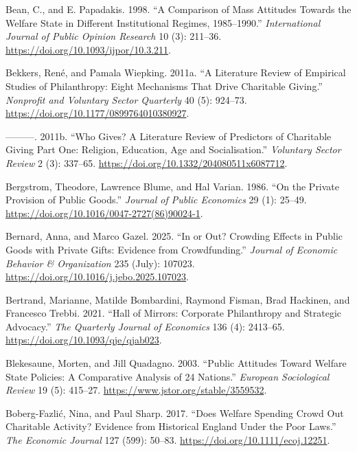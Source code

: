 \documentclass[
  11pt,
  oneside]{article}
\newlength{\cslhangindent}
\newenvironment{CSLReferences}[2] %
 {\begin{list}{}{%
  \setlength{\itemindent}{0pt}
  \setlength{\leftmargin}{0pt}
  \setlength{\parsep}{0pt}
  \ifodd #1
   \setlength{\leftmargin}{\cslhangindent}
   \setlength{\itemindent}{-1\cslhangindent}
  \fi
  \setlength{\itemsep}{#2\baselineskip}}}
 {\end{list}}
\begin{document}
\begin{CSLReferences}{1}{0}
Bean, C., and E. Papadakis. 1998. {``A Comparison of Mass Attitudes Towards the Welfare State in Different Institutional Regimes, 1985--1990.''} \emph{International Journal of Public Opinion Research} 10 (3): 211--36. \url{https://doi.org/10.1093/ijpor/10.3.211}.

Bekkers, René, and Pamala Wiepking. 2011a. {``A {Literature Review} of {Empirical Studies} of {Philanthropy}: {Eight Mechanisms That Drive Charitable Giving}.''} \emph{Nonprofit and Voluntary Sector Quarterly} 40 (5): 924--73. \url{https://doi.org/10.1177/0899764010380927}.

---------. 2011b. {``Who Gives? {A} Literature Review of Predictors of Charitable Giving {Part One}: {Religion}, Education, Age and Socialisation.''} \emph{Voluntary Sector Review} 2 (3): 337--65. \url{https://doi.org/10.1332/204080511x6087712}.

Bergstrom, Theodore, Lawrence Blume, and Hal Varian. 1986. {``On the Private Provision of Public Goods.''} \emph{Journal of Public Economics} 29 (1): 25--49. \url{https://doi.org/10.1016/0047-2727(86)90024-1}.

Bernard, Anna, and Marco Gazel. 2025. {``In or Out? {Crowding} Effects in Public Goods with Private Gifts: {Evidence} from Crowdfunding.''} \emph{Journal of Economic Behavior \& Organization} 235 (July): 107023. \url{https://doi.org/10.1016/j.jebo.2025.107023}.

Bertrand, Marianne, Matilde Bombardini, Raymond Fisman, Brad Hackinen, and Francesco Trebbi. 2021. {``Hall of {Mirrors}: {Corporate Philanthropy} and {Strategic Advocacy}.''} \emph{The Quarterly Journal of Economics} 136 (4): 2413--65. \url{https://doi.org/10.1093/qje/qjab023}.

Blekesaune, Morten, and Jill Quadagno. 2003. {``Public {Attitudes} Toward {Welfare State Policies}: {A Comparative Analysis} of 24 {Nations}.''} \emph{European Sociological Review} 19 (5): 415--27. \url{https://www.jstor.org/stable/3559532}.

Boberg-Fazlić, Nina, and Paul Sharp. 2017. {``Does {Welfare Spending Crowd Out Charitable Activity}? {Evidence} from {Historical England Under} the {Poor Laws}.''} \emph{The Economic Journal} 127 (599): 50--83. \url{https://doi.org/10.1111/ecoj.12251}.


\end{CSLReferences}
\end{document}
